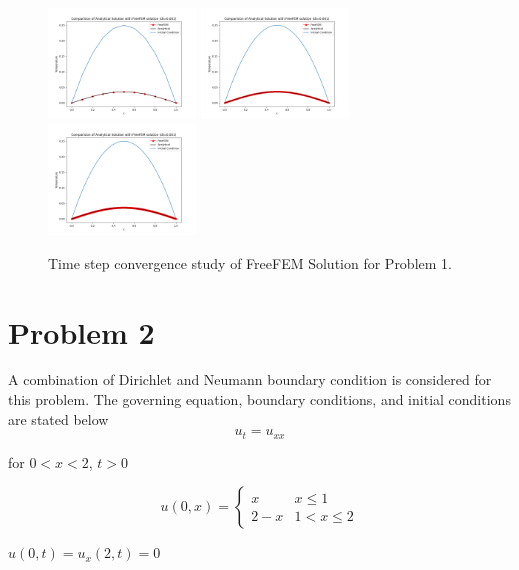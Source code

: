 \documentclass[11pt]{article} %
\begin{document}
\begin{figure}[H]
\centering
\includegraphics[width=0.35\textwidth]{figures/p12001x1.png}
\includegraphics[width=0.35\textwidth]{figures/p12001.png}
\includegraphics[width=0.35\textwidth]{figures/p12001x001.png}
\caption{Time step convergence study of FreeFEM Solution for Problem 1.}
\end{figure}
\newpage
\section{Problem 2}
A combination of Dirichlet and Neumann boundary condition is considered for this problem. The governing equation, boundary conditions, and initial conditions are stated below
\begin{equation}
u_t = u_{xx}
\end{equation}
\begin{center}
for $0<x<2$, $t>0$
\end{center}
\begin{equation}
u(0,x) = 
\begin{cases}
x & x\leq 1\\
2-x & 1<x\leq 2
\end{cases}
\end{equation}

\begin{center}
$u(0,t) = u_x(2,t) = 0$
\end{center}
\end{document}
